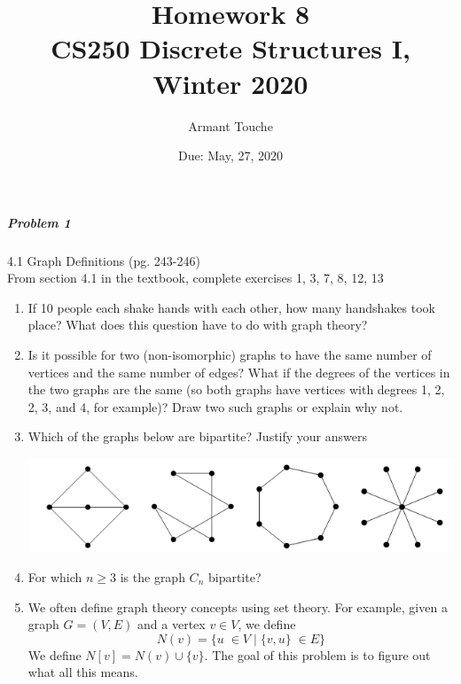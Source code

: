 \documentclass[11pt,a4paper]{article}
\title{\bf Homework 8\\[1ex]
\rm\normalsize CS250 Discrete Structures I, Winter 2020 }
\date{\normalsize Due: May, 27, 2020}
\author{\normalsize Armant Touche}
\newcommand\setItemNumber[1]{\setcounter{enumi}{\numexpr#1-1\relax}}
\begin{document}
 
\vspace{0cm}\maketitle 
	
	
	\subparagraph{Problem 1} 4.1 Graph Definitions (pg. 243-246) \\
			
		From section 4.1 in the textbook, complete exercises 1, 3, 7, 8, 12, 13

        \begin{enumerate}

        \item  If 10 people each shake hands with each other, how many handshakes took place? What does this question have to do with graph theory?

        \setItemNumber{3}
    \item Is it possible for two  (non-isomorphic) graphs to have the same number of vertices and the same number of edges? What if the degrees of the vertices in the two graphs are the same (so both graphs have vertices with degrees 1, 2, 2, 3, and 4, for example)? Draw two such graphs or explain why not.

        \setItemNumber{7}
        \item Which of the graphs below are bipartite? Justify your answers

            \begin{center}
            \includegraphics[width=.5\textwidth]{hw8_graphic1}
            \end{center}

        \item For which $n\geq 3$ is the graph $C_n$ bipartite?

        \setItemNumber{12}
    \item We often define graph theory concepts using set theory. For example, given a graph $G = (V, E)$ and a vertex $v\in V$, we define
        $$N(v) = \{u\;\in V\; |\; \{v,u\}\;\in E\}$$
        We define $N[v] = N(v)\cup \{v\}$. The goal of this problem is to figure out what all this means.
        \begin{enumerate}


\end{enumerate}
\end{enumerate}
\end{document}
